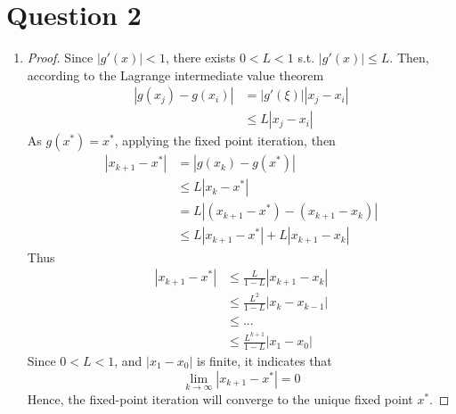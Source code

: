 \documentclass[paper=a4, fontsize=11pt]{scrartcl} %
\numberwithin{equation}{section} %
\numberwithin{figure}{section} %
\numberwithin{table}{section} %
\begin{document}
\section{Question 2}
	\begin{enumerate}
		\item 
			\begin{proof}
				Since $|g'(x)|<1$, there exists $0<L<1$ s.t. $|g'(x)| \leq L$.
				Then, according to the Lagrange intermediate value theorem
				\begin{equation}
					\begin{aligned}
						|g(x_j) - g(x_i)| &= |g'(\xi)||x_j - x_i|\\
										  &\leq L|x_j - x_i|
					\end{aligned}
				\end{equation}
				As $g(x^*) = x^*$, applying the fixed point iteration, then
				\begin{equation}
					\begin{aligned}
						|x_{k+1} - x^*| & = |g(x_k) - g(x^*)|\\
										& \leq L|x_k - x^*|\\
										& = L |(x_{k+1}-x^*) - (x_{k+1} - x_k)|\\
										& \leq L|x_{k+1}-x^*| + L|x_{k+1} - x_k|
					\end{aligned}
				\end{equation}
				Thus
				\begin{equation}
					\begin{aligned}
						|x_{k+1} - x^*| & \leq \frac{L}{1-L} |x_{k+1} - x_k|\\
						                & \leq \frac{L^2}{1-L}|x_k - x_{k-1}|\\
						                & \leq ...\\
						                & \leq \frac{L^{k+1}}{1-L} |x_1 - x_0|
					\end{aligned}
				\end{equation}
				Since $0<L<1$, and $|x_1 - x_0|$ is finite, it indicates that
				\begin{equation}
					\lim\limits_{k\rightarrow\infty}|x_{k+1} - x^*| = 0
				\end{equation}
				Hence, the fixed-point iteration will converge to the unique fixed point $x^*$.
			\end{proof}


\end{enumerate}
\end{document}

